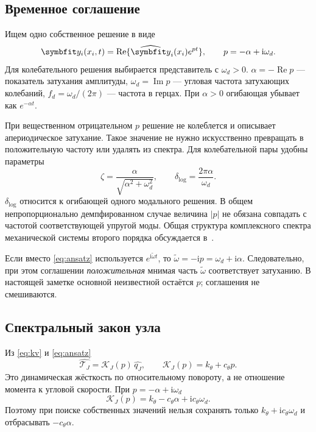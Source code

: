 \documentclass[11pt,a4paper]{article}
\numberwithin{equation}{section}
\newcommand{\ii}{\mathrm i}
\newcommand{\kth}{k_\theta}
\newcommand{\cth}{c_\theta}
\newcommand{\qJ}{q_J}
\newcommand{\TJ}{\mathcal T_J}
\newcommand{\KJ}{\mathcal K_J}
\begin{document}
\subsection{Временное соглашение}

Ищем одно собственное решение в виде
\begin{equation}
 \symbfit y_i(x_i,t)=\operatorname{Re}
 \{\widehat{\symbfit y}_i(x_i)e^{pt}\},
 \qquad p=-\alpha+\ii\omega_d.
 \label{eq:ansatz}
\end{equation}
Для колебательного решения выбирается представитель с $\omega_d>0$.
$\alpha=-\operatorname{Re}p$ --- показатель затухания амплитуды,
$\omega_d=\operatorname{Im}p$ --- угловая частота затухающих колебаний,
$f_d=\omega_d/(2\pi)$ --- частота в герцах. При $\alpha>0$
огибающая убывает как $e^{-\alpha t}$.

При вещественном отрицательном $p$ решение не колеблется и описывает
апериодическое затухание. Такое значение не нужно искусственно превращать
в положительную частоту или удалять из спектра. Для колебательной пары
удобны параметры
\begin{equation}
 \zeta=\frac{\alpha}{\sqrt{\alpha^2+\omega_d^2}},
 \qquad
 \delta_{\log}=\frac{2\pi\alpha}{\omega_d}.
 \label{eq:dampingratios}
\end{equation}
$\delta_{\log}$ относится к огибающей одного модального решения.
В общем непропорционально демпфированном случае величина $|p|$
не обязана совпадать с частотой соответствующей упругой моды.
Общая структура комплексного спектра механической системы второго
порядка обсуждается в~\cite{tisseur2001}.

Если вместо \eqref{eq:ansatz} используется $e^{\ii\widetilde\omega t}$,
то $\widetilde\omega=-\ii p=\omega_d+\ii\alpha$.
Следовательно, при этом соглашении \emph{положительная} мнимая часть
$\widetilde\omega$ соответствует затуханию. В настоящей заметке
основной неизвестной остаётся $p$; соглашения не смешиваются.

\subsection{Спектральный закон узла}

Из \eqref{eq:kv} и \eqref{eq:ansatz}
\begin{equation}
 \widehat{\TJ}=\KJ(p)\,\widehat{\qJ},
 \qquad \boxed{\KJ(p)=\kth+\cth p.}
 \label{eq:dynamicstiffness}
\end{equation}
Это динамическая жёсткость по относительному повороту, а не отношение
момента к угловой скорости. При $p=-\alpha+\ii\omega_d$
\[
 \KJ(p)=\kth-\cth\alpha+\ii\cth\omega_d.
\]
Поэтому при поиске собственных значений нельзя сохранять только
$\kth+\ii\cth\omega_d$ и отбрасывать $-\cth\alpha$.
\end{document}
